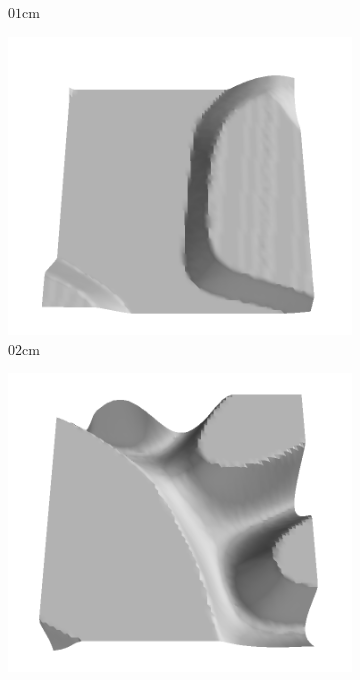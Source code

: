 \documentclass[../document.tex]{subfiles}
\begin{document}
\begin{figure}[htbp]
\begin{subfigure}[b]{0.19\textwidth}
    \caption{$01$cm}
    \end{subfigure}
    \begin{subfigure}[b]{0.19\textwidth}
    \includegraphics[width=\linewidth]{../img/5/train/all/02-patch-3d-majavi-6.png}
    \caption{$02$cm}
    \end{subfigure}
    \begin{subfigure}[b]{0.19\textwidth}
    \includegraphics[width=\linewidth]{../img/5/train/all/03-patch-3d-majavi-7.png}

\end{subfigure}
\end{figure}
\end{document}
